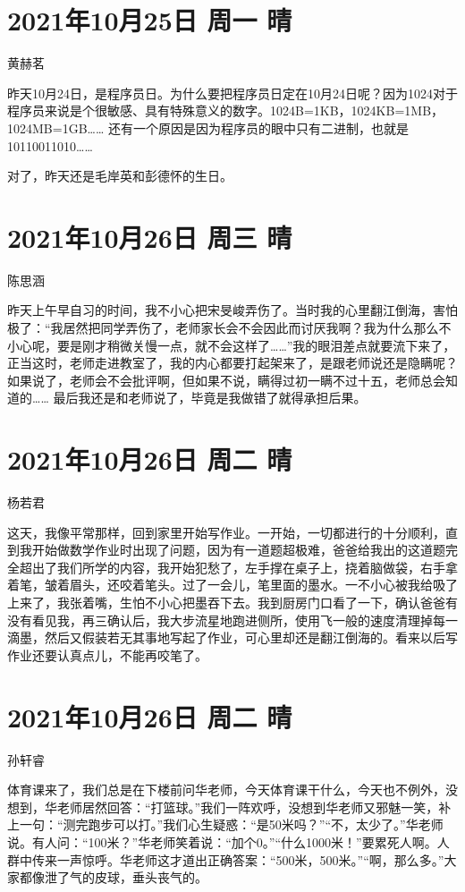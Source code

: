 \section{2021年10月25日 周一 晴}

黄赫茗

昨天10月24日，是程序员日。为什么要把程序员日定在10月24日呢？因为1024对于程序员来说是个很敏感、具有特殊意义的数字。1024B=1KB，1024KB=1MB，1024MB=1GB…… 还有一个原因是因为程序员的眼中只有二进制，也就是10110011010……

对了，昨天还是毛岸英和彭德怀的生日。

\section{2021年10月26日 周三 晴}

陈思涵

昨天上午早自习的时间，我不小心把宋旻峻弄伤了。当时我的心里翻江倒海，害怕极了：“我居然把同学弄伤了，老师家长会不会因此而讨厌我啊？我为什么那么不小心呢，要是刚才稍微关慢一点，就不会这样了……”我的眼泪差点就要流下来了，正当这时，老师走进教室了，我的内心都要打起架来了，是跟老师说还是隐瞒呢？如果说了，老师会不会批评啊，但如果不说，瞒得过初一瞒不过十五，老师总会知道的…… 最后我还是和老师说了，毕竟是我做错了就得承担后果。

\section{2021年10月26日 周二 晴}

杨若君

这天，我像平常那样，回到家里开始写作业。一开始，一切都进行的十分顺利，直到我开始做数学作业时出现了问题，因为有一道题超极难，爸爸给我出的这道题完全超出了我们所学的内容，我开始犯愁了，左手撑在桌子上，挠着脑做袋，右手拿着笔，皱着眉头，还咬着笔头。过了一会儿，笔里面的墨水。一不小心被我给吸了上来了，我张着嘴，生怕不小心把墨吞下去。我到厨房门口看了一下，确认爸爸有没有看见我，再三确认后，我大步流星地跑进侧所，使用飞一般的速度清理掉每一滴墨，然后又假装若无其事地写起了作业，可心里却还是翻江倒海的。看来以后写作业还要认真点儿，不能再咬笔了。

\section{2021年10月26日 周二 晴}

孙轩睿

体育课来了，我们总是在下楼前问华老师，今天体育课干什么，今天也不例外，没想到，华老师居然回答：“打篮球。”我们一阵欢呼，没想到华老师又邪魅一笑，补上一句：“测完跑步可以打。”我们心生疑惑：“是50米吗？”“不，太少了。”华老师说。有人问：“100米？”华老师笑着说：“加个0。”“什么1000米！”要累死人啊。人群中传来一声惊呼。华老师这才道出正确答案：“500米，500米。”“啊，那么多。”大家都像泄了气的皮球，垂头丧气的。

